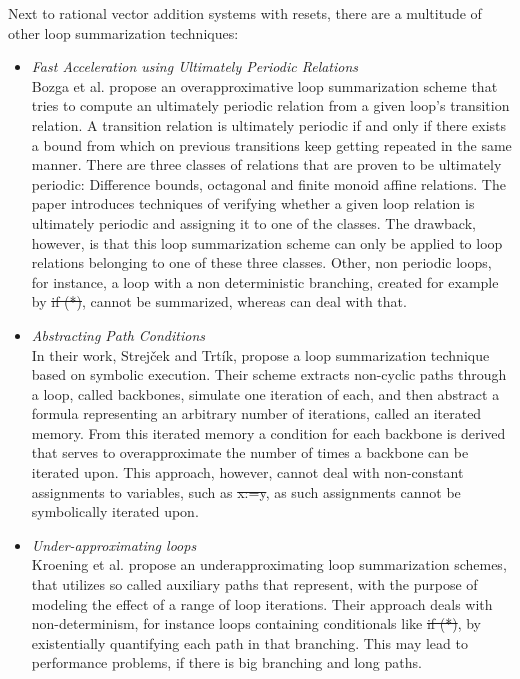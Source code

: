 
Next to rational vector addition systems with resets, there are a multitude of other loop summarization techniques:
\begin{itemize}
	\item \textsl{Fast Acceleration using Ultimately Periodic Relations}\cite{10.1007/978-3-642-14295-6_23}\\ Bozga et al. propose an overapproximative loop summarization scheme that tries to compute an ultimately periodic relation from a given loop's transition relation. A transition relation is ultimately periodic if and only if there exists a bound from which on previous transitions keep getting repeated in the same manner. There are three classes of relations that are proven to be ultimately periodic: Difference bounds, octagonal and finite monoid affine relations. The paper introduces techniques of verifying whether a given loop relation is ultimately periodic and assigning it to one of the classes. The drawback, however, is that this loop summarization scheme can only be applied to loop relations belonging to one of these three classes. Other, non periodic loops, for instance, a loop with a non deterministic branching, created for example by \st{if (*)}, cannot be summarized, whereas \qvasr can deal with that.
	
	\item \textsl{Abstracting Path Conditions}\cite{DBLP:conf/issta/StrejcekT12} \\
	In their work, Strejček and Trtík, propose a loop summarization technique based on symbolic execution. Their scheme extracts non-cyclic paths through a loop, called backbones, simulate one iteration of each, and then abstract a formula representing an arbitrary number of iterations, called an iterated memory. From this iterated memory a condition for each backbone is derived that serves to overapproximate the number of times a backbone can be iterated upon. This approach, however, cannot deal with non-constant assignments to variables, such as \st{x:=y}, as such assignments cannot be symbolically iterated upon.
	
	\item \textsl{Under-approximating loops}\cite{DBLP:conf/cav/KroeningLW13} \\
	Kroening et al. propose an underapproximating loop summarization schemes, that utilizes so called auxiliary paths that represent, with the purpose of modeling the effect of a range of loop iterations. Their approach deals with non-determinism, for instance loops containing conditionals like \st{if (*)}, by existentially quantifying each path in that branching. This may lead to performance problems, if there is big branching and long paths.
\end{itemize}